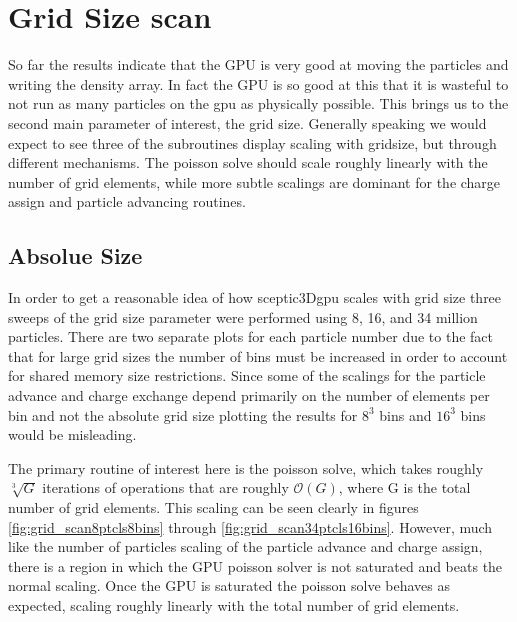 	
\section{Grid Size scan}
So far the results indicate that the GPU is very good at moving the particles and writing the density array. In fact the GPU is so good at this that it is wasteful to not run as many particles on the gpu as physically possible. This brings us to the second main parameter of interest, the grid size. Generally speaking we would expect to see three of the subroutines display scaling with gridsize, but through different mechanisms. The poisson solve should scale roughly linearly with the number of grid elements, while more subtle scalings are dominant for the charge assign and particle advancing routines. 

	\subsection{Absolue Size}
	In order to get a reasonable idea of how sceptic3Dgpu scales with grid size three sweeps of the grid size parameter were performed using 8, 16, and 34 million particles. There are two separate plots for each particle number due to the fact that for large grid sizes the number of bins must be increased in order to account for shared memory size restrictions. Since some of the scalings for the particle advance and charge exchange depend primarily on the number of elements per bin and not the absolute grid size plotting the results for $8^3$ bins and $16^3$ bins would be misleading.

The primary routine of interest here is the poisson solve, which takes roughly $\sqrt[3]{G}$ iterations of operations that are roughly $\mathcal{O}(G)$, where G is the total number of grid elements. This scaling can be seen clearly in figures \ref{fig:grid_scan8ptcls8bins} through \ref{fig:grid_scan34ptcls16bins}. However, much like the number of particles scaling of the particle advance and charge assign, there is a region in which the GPU poisson solver is not saturated and beats the normal scaling. Once the GPU is saturated the poisson solve behaves as expected, scaling roughly linearly with the total number of grid elements. 

